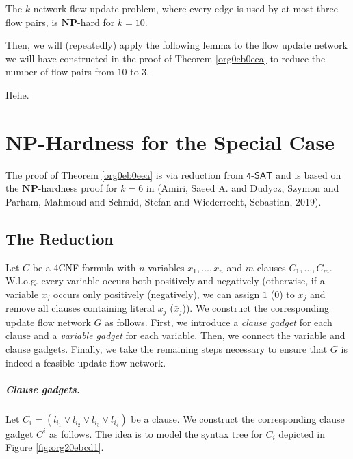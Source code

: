 \documentclass[fontsize=11pt,paper=a4]{book}
\begin{document}
\begin{thm}
The \(k\)-network flow update problem, where every edge is used by at most three flow pairs, is \(\textbf{NP}\)-hard for \(k=10\).
\label{org0eb0eea}
\end{thm}

Then, we will (repeatedly) apply the following lemma to the flow update network we will have constructed in the proof of Theorem \ref{org0eb0eea} to reduce the number of flow pairs from \(10\) to \(3\).

\begin{lem}
Hehe.
\label{org2639136}
\end{lem}

\chapter{\(\textbf{NP}\)-Hardness for the Special Case}
\label{sec:org4bc5e37}

The proof of Theorem \ref{org0eb0eea} is via reduction from \(\textsf{4-SAT}\) and is based on the \(\textbf{NP}\)-hardness proof for \(k=6\) in (Amiri, Saeed A. and Dudycz, Szymon and Parham, Mahmoud and Schmid, Stefan and Wiederrecht, Sebastian, 2019).

\section{The Reduction}
\label{sec:orgc990ae4}

Let \(C\) be a 4CNF formula with \(n\) variables \(x_1,\dots,x_n\) and \(m\) clauses \(C_1,\dots,C_m\).
W.l.o.g. every variable occurs both positively and negatively (otherwise, if a variable \(x_j\) occurs only positively (negatively), we can assign \(1\) (\(0\)) to \(x_j\) and remove all clauses containing literal \(x_j\) (\(\bar{x}_j\))).
We construct the corresponding update flow network \(G\) as follows.
First, we introduce a \emph{clause gadget} for each clause and a \emph{variable gadget} for each variable.
Then, we connect the variable and clause gadgets.
Finally, we take the remaining steps necessary to ensure that \(G\) is indeed a feasible update flow network.

\paragraph{Clause gadgets.}
Let \(C_i=(l_{i_1}\vee l_{i_2}\vee l_{i_3}\vee l_{i_4})\) be a clause.
We construct the corresponding clause gadget \(C^i\) as follows.
The idea is to model the syntax tree for \(C_i\) depicted in Figure \ref{fig:org20ebcd1}.
\end{document}

